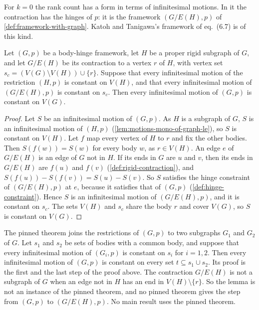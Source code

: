 For $k = 0$ the rank count has a form in terms of infinitesimal motions.
In it the contraction has the hinges of $p$: it is the framework
$(G/E(H), p)$ of \cref{def:framework-with-graph}. Katoh and Tanigawa's
framework of eq.~(6.7) is of this kind.

\begin{lemma}
  \label{lem:case-I-splice-seed}
  \leanok
  Let $(G,p)$ be a body-hinge framework, let $H$ be a proper rigid
  subgraph of $G$, and let $G/E(H)$ be its contraction to a vertex $r$ of
  $H$, with vertex set $s_c = (V(G) \setminus V(H)) \cup \{r\}$. Suppose
  that every infinitesimal motion of the restriction $(H,p)$ is constant
  on $V(H)$, and that every infinitesimal motion of $(G/E(H), p)$ is
  constant on $s_c$. Then every infinitesimal motion of $(G,p)$ is
  constant on $V(G)$.
\end{lemma}
\begin{proof}
  \leanok
  Let $S$ be an infinitesimal motion of $(G,p)$. As $H$ is a subgraph of
  $G$, $S$ is an infinitesimal motion of $(H,p)$
  (\cref{lem:motions-mono-of-graph-le}), so $S$ is constant on $V(H)$.
  Let $f$ map every vertex of $H$ to $r$ and fix the other bodies. Then
  $S(f(w)) = S(w)$ for every body $w$, as $r \in V(H)$. An edge $e$ of
  $G/E(H)$ is an edge of $G$ not in $H$. If its ends in $G$ are $u$ and
  $v$, then its ends in $G/E(H)$ are $f(u)$ and $f(v)$
  (\cref{def:rigid-contraction}), and
  $S(f(u)) - S(f(v)) = S(u) - S(v)$. So $S$ satisfies the hinge
  constraint of $(G/E(H), p)$ at $e$, because it satisfies that of
  $(G,p)$ (\cref{def:hinge-constraint}). Hence $S$ is an infinitesimal
  motion of $(G/E(H), p)$, and it is constant on $s_c$. The sets $V(H)$
  and $s_c$ share the body $r$ and cover $V(G)$, so $S$ is constant on
  $V(G)$.
\end{proof}

\begin{fmlnote}
  The pinned theorem joins the restrictions of $(G,p)$ to two subgraphs
  $G_1$ and $G_2$ of $G$. Let $s_1$ and $s_2$ be sets of bodies with a
  common body, and suppose that every infinitesimal motion of $(G_i, p)$
  is constant on $s_i$ for $i = 1, 2$. Then every infinitesimal motion of
  $(G,p)$ is constant on every set $t \subseteq s_1 \cup s_2$. Its proof
  is the first and the last step of the proof above. The contraction
  $G/E(H)$ is not a subgraph of $G$ when an edge not in $H$ has an end in
  $V(H) \setminus \{r\}$. So the lemma is not an instance of the pinned
  theorem, and no pinned theorem gives the step from $(G,p)$ to
  $(G/E(H), p)$. No main result uses the pinned theorem.
\end{fmlnote}

